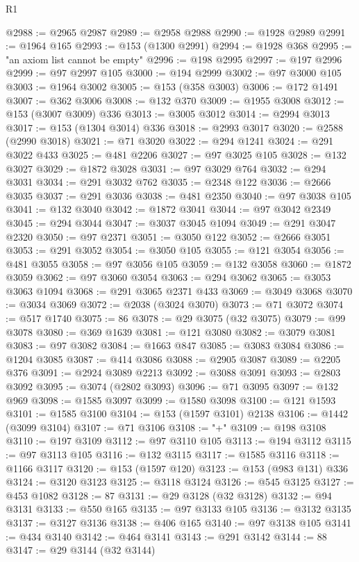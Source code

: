 \begin{lexlean}{R1}
\begin{coremodule}
{{{{{{{{{{{{{{{{{{{{{{{{{{{{{{{{{{{{{{{{{{{{{{{{{{{{{{{{{{{{{{{{{{{{{{{{{{{{{{{{{{{{{{{{{{{{{{{{{{{{{{{{{{{{{{{{{{{{{{{{{{{{{{{{{{{{{{{{{{{{{{{{{{{{{{{{{{{{{{{{{{{{{{{{{{{{{{{{{{{{{{{{{{@2988 := @2965 @2987
@2989 := @2958 @2988
@2990 := @1928 @2989
@2991 := @1964 @165
@2993 := @153 (@1300 @2991)
@2994 := @1928 @368
@2995 := "an axiom list cannot be empty"
@2996 := @198 @2995
@2997 := @197 @2996
@2999 := @97 @2997 @105
@3000 := @194 @2999
@3002 := @97 @3000 @105
@3003 := @1964 @3002
@3005 := @153 (@358 @3003)
@3006 := @172 @1491
@3007 := @362 @3006
@3008 := @132 @370
@3009 := @1955 @3008
@3012 := @153 (@3007 @3009) @336
@3013 := @3005 @3012
@3014 := @2994 @3013
@3017 := @153 (@1304 @3014) @336
@3018 := @2993 @3017
@3020 := @2588 (@2990 @3018)
@3021 := @71 @3020
@3022 := @294 @1241
@3024 := @291 @3022 @433
@3025 := @481 @2206
@3027 := @97 @3025 @105
@3028 := @132 @3027
@3029 := @1872 @3028
@3031 := @97 @3029 @764
@3032 := @294 @3031
@3034 := @291 @3032 @762
@3035 := @2348 @122
@3036 := @2666 @3035
@3037 := @291 @3036
@3038 := @481 @2350
@3040 := @97 @3038 @105
@3041 := @132 @3040
@3042 := @1872 @3041
@3044 := @97 @3042 @2349
@3045 := @294 @3044
@3047 := @3037 @3045 @1094
@3049 := @291 @3047 @2320
@3050 := @97 @2371
@3051 := @3050 @122
@3052 := @2666 @3051
@3053 := @291 @3052
@3054 := @3050 @105
@3055 := @121 @3054
@3056 := @481 @3055
@3058 := @97 @3056 @105
@3059 := @132 @3058
@3060 := @1872 @3059
@3062 := @97 @3060 @3054
@3063 := @294 @3062
@3065 := @3053 @3063 @1094
@3068 := @291 @3065 @2371 @433
@3069 := @3049 @3068
@3070 := @3034 @3069
@3072 := @2038 (@3024 @3070)
@3073 := @71 @3072
@3074 := @517 @1740
@3075 := 86
@3078 := @29 @3075 (@32 @3075)
@3079 := @99 @3078
@3080 := @369 @1639
@3081 := @121 @3080
@3082 := @3079 @3081
@3083 := @97 @3082
@3084 := @1663 @847
@3085 := @3083 @3084
@3086 := @1204 @3085
@3087 := @414 @3086
@3088 := @2905 @3087
@3089 := @2205 @376
@3091 := @2924 @3089 @2213
@3092 := @3088 @3091
@3093 := @2803 @3092
@3095 := @3074 (@2802 @3093)
@3096 := @71 @3095
@3097 := @132 @969
@3098 := @1585 @3097
@3099 := @1580 @3098
@3100 := @121 @1593
@3101 := @1585 @3100
@3104 := @153 (@1597 @3101) @2138
@3106 := @1442 (@3099 @3104)
@3107 := @71 @3106
@3108 := "+"
@3109 := @198 @3108
@3110 := @197 @3109
@3112 := @97 @3110 @105
@3113 := @194 @3112
@3115 := @97 @3113 @105
@3116 := @132 @3115
@3117 := @1585 @3116
@3118 := @1166 @3117
@3120 := @153 (@1597 @120)
@3123 := @153 (@983 @131) @336
@3124 := @3120 @3123
@3125 := @3118 @3124
@3126 := @545 @3125
@3127 := @453 @1082
@3128 := 87
@3131 := @29 @3128 (@32 @3128)
@3132 := @94 @3131
@3133 := @550 @165
@3135 := @97 @3133 @105
@3136 := @3132 @3135
@3137 := @3127 @3136
@3138 := @406 @165
@3140 := @97 @3138 @105
@3141 := @434 @3140
@3142 := @464 @3141
@3143 := @291 @3142
@3144 := 88
@3147 := @29 @3144 (@32 @3144)
}}}}}}}}}}}}}}}}}}}}}}}}}}}}}}}}}}}}}}}}}}}}}}}}}}}}}}}}}}}}}}}}}}}}}}}}}}}}}}}}}}}}}}}}}}}}}}}}}}}}}}}}}}}}}}}}}}}}}}}}}}}}}}}}}}}}}}}}}}}}}}}}}}}}}}}}}}}}}}}}}}}}}}}}}}}}}}}}}}}}}}}}}}
\end{coremodule}
\end{lexlean}

